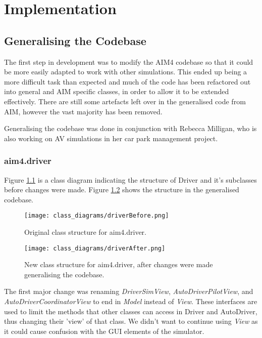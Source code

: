 \chapter{Implementation}
\label{cha:Implementation}

\section{Generalising the Codebase}
\label{sec:Generalising the Codebase}
The first step in development was to modify the AIM4 codebase so that it could be more easily adapted to work with other simulations. This ended up being a more difficult task than expected and much of the code has been refactored out into general and AIM specific classes, in order to allow it to be extended effectively. There are still some artefacts left over in the generalised code from AIM, however the vast majority has been removed. 

Generalising the codebase was done in conjunction with Rebecca Milligan, who is also working on AV simulations in her car park management project.

\subsection{aim4.driver}
\label{subsec:aim4.driver}
Figure \ref{fig:driverBefore} is a class diagram indicating the structure of Driver and it's subclasses before changes were made. Figure \ref{fig:driverAfter} shows the structure in the generalised codebase.

\begin{figure}[htb]
\texttt{[image: class\_diagrams/driverBefore.png]}
\caption{Original class structure for aim4.driver.}
\label{fig:driverBefore}
\end{figure}

\begin{figure}[htb]
\texttt{[image: class\_diagrams/driverAfter.png]}
\caption{New class structure for aim4.driver, after changes were made generalising the codebase.}
\label{fig:driverAfter}
\end{figure}

The first major change was renaming \emph{DriverSimView}, \emph{AutoDriverPilotView}, and \emph{AutoDriverCoordinatorView} to end in \emph{Model} instead of \emph{View}. These interfaces are used to limit the methods that other classes can access in Driver and AutoDriver, thus changing their 'view' of that class. We didn't want to continue using \emph{View} as it could cause confusion with the GUI elements of the simulator. 

